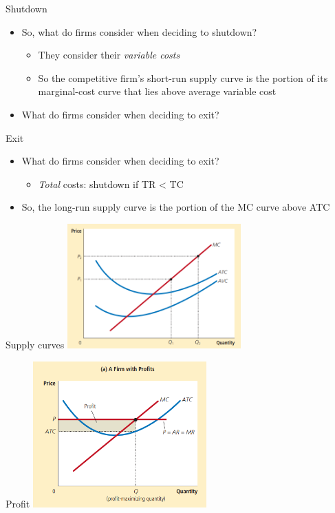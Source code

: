\documentclass[aspectratio=169]{beamer}
\begin{document}
\begin{frame}{Shutdown}
    \begin{itemize}
        \item So, what do firms consider when deciding to shutdown?
            \begin{itemize}
                \item They consider their \textit{variable costs}
                \item So the competitive firm’s short-run supply curve is the portion of its marginal-cost curve that lies above average variable cost
            \end{itemize}
        \item What do firms consider when deciding to exit?
    \end{itemize}
\end{frame}

\begin{frame}{Exit}
    \begin{itemize}
        \item What do firms consider when deciding to exit?
            \begin{itemize}
                \item \textit{Total} costs: shutdown if TR < TC
            \end{itemize}
        \item So, the long-run supply curve is the portion of the MC curve above ATC
    \end{itemize}
\end{frame}

\begin{frame}{Supply curves}
    \centering
    \includegraphics[width = 0.5\textwidth,keepaspectratio]{supply.png}
\end{frame}

\begin{frame}{Profit}
    \centering
    \includegraphics[width = 0.5\textwidth,keepaspectratio]{profit.png}
\end{frame}
\end{document}
